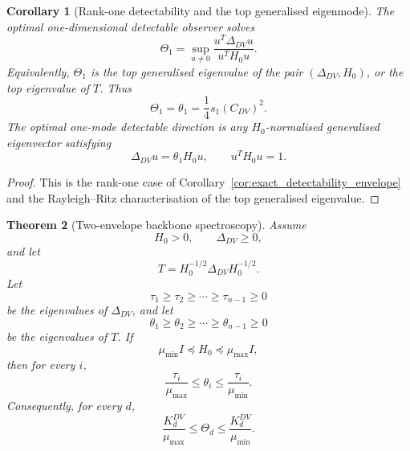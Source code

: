 \documentclass[11pt,a4paper]{article}
\numberwithin{equation}{section}
\theoremstyle{thmcompact}
\newtheorem{theorem}{Theorem}[section]
\newtheorem{corollary}[theorem]{Corollary}
\theoremstyle{remark}
\begin{document}
\begin{corollary}[Rank-one detectability and the top generalised eigenmode]
\label{thm:one_mode_detectability}
The optimal one-dimensional detectable observer solves
\begin{equation}
\Theta_1
=
\sup_{u\neq 0}
\frac{u^T\Delta_{DV}u}{u^T H_0 u}.
\end{equation}
Equivalently, \(\Theta_1\) is the top generalised eigenvalue of the pair \((\Delta_{DV},H_0)\), or the top eigenvalue of \(T\). Thus
\begin{equation}
\Theta_1=\theta_1=\frac14 s_1(C_{DV})^2.
\end{equation}
The optimal one-mode detectable direction is any \(H_0\)-normalised generalised eigenvector satisfying
\begin{equation}
\Delta_{DV}u=\theta_1 H_0 u,
\qquad
u^T H_0 u=1.
\end{equation}
\end{corollary}

\begin{proof}
This is the rank-one case of Corollary~\ref{cor:exact_detectability_envelope} and the Rayleigh--Ritz characterisation of the top generalised eigenvalue.
\end{proof}


\begin{theorem}[Two-envelope backbone spectroscopy]
\label{thm:two_envelope_backbone_spectroscopy}
Assume
\begin{equation}
H_0>0,
\qquad
\Delta_{DV}\ge 0,
\end{equation}
and let
\begin{equation}
T=H_0^{-1/2}\Delta_{DV}H_0^{-1/2}.
\end{equation}
Let
\begin{equation}
\tau_1\ge \tau_2\ge \cdots \ge \tau_{n-1}\ge 0
\end{equation}
be the eigenvalues of \(\Delta_{DV}\), and let
\begin{equation}
\theta_1\ge \theta_2\ge \cdots \ge \theta_{n-1}\ge 0
\end{equation}
be the eigenvalues of \(T\). If
\begin{equation}
\mu_{\min}I\preceq H_0\preceq \mu_{\max}I,
\end{equation}
then for every \(i\),
\begin{equation}
\frac{\tau_i}{\mu_{\max}}
\le
\theta_i
\le
\frac{\tau_i}{\mu_{\min}}.
\end{equation}
Consequently, for every \(d\),
\begin{equation}
\frac{K_d^{DV}}{\mu_{\max}}
\le
\Theta_d
\le
\frac{K_d^{DV}}{\mu_{\min}}.
\end{equation}
\end{theorem}
\end{document}
